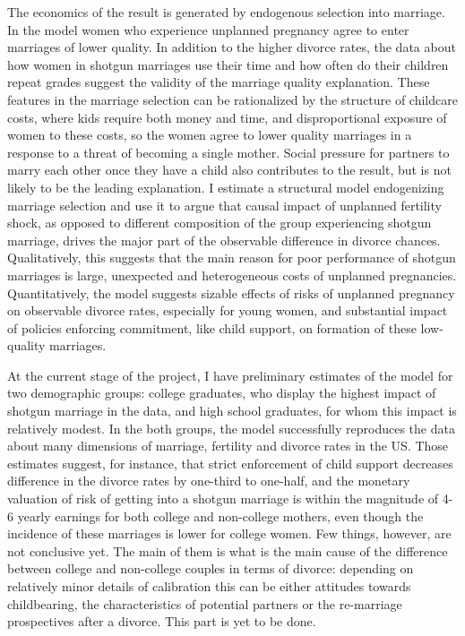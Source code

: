 \documentclass[11pt,letter]{article}
\begin{document}
The economics of the result is generated by endogenous selection into marriage. In the model women who experience unplanned pregnancy agree to enter marriages of lower quality. In addition to the higher divorce rates, the data about how women in shotgun marriages use their time and how often do their children repeat grades suggest the validity of the marriage quality explanation. These features in the marriage selection can be rationalized by the structure of childcare costs, where kids require both money and time, and disproportional exposure of women to these costs, so the women agree to lower quality marriages in a response to a threat of becoming a single mother. Social pressure for partners to marry each other once they have a child also contributes to the result, but is not likely to be the leading explanation. I estimate a structural model endogenizing marriage selection and use it to argue that causal impact of unplanned fertility shock, as opposed to different composition of the group experiencing shotgun marriage, drives the major part of the observable difference in divorce chances. Qualitatively, this suggests that the main reason for poor performance of shotgun marriages is large, unexpected and heterogeneous costs of unplanned pregnancies. Quantitatively, the model suggests sizable effects of risks of unplanned pregnancy on observable divorce rates, especially for young women, and substantial impact of policies enforcing commitment, like child support, on formation of these low-quality marriages.

At the current stage of the project, I have preliminary estimates of the model for two demographic groups: college graduates, who display the highest impact of shotgun marriage in the data, and high school graduates, for whom this impact is relatively modest. In the both groups, the model successfully reproduces the data about many dimensions of marriage, fertility and divorce rates in the US. Those estimates suggest, for instance, that strict enforcement of child support decreases difference in the divorce rates by one-third to one-half, and the monetary valuation of risk of getting into a shotgun marriage is within the magnitude of 4-6 yearly earnings for both college and non-college mothers, even though the incidence of these marriages is lower for college women. Few things, however, are not conclusive yet. The main of them is what is the main cause of the difference between college and non-college couples in terms of divorce: depending on relatively minor details of calibration this can be either attitudes towards childbearing, the characteristics of potential partners or the re-marriage prospectives after a divorce. This part is yet to be done.
\end{document}
